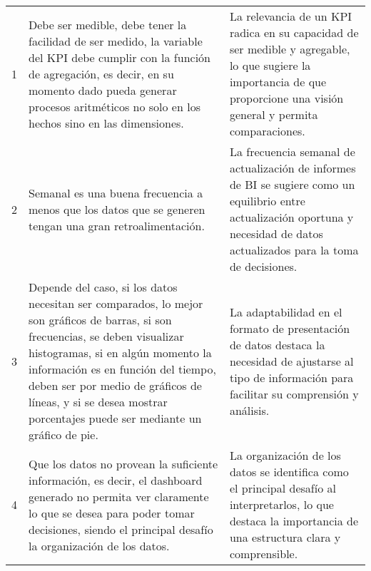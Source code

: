\begin{longtable}{|p{0.6cm}|p{6cm}|p{6cm}|}
    1                                                 & Debe ser medible, debe tener la facilidad de ser medido, la variable del KPI debe cumplir con la función de agregación, es decir, en su momento dado pueda generar procesos aritméticos no solo en los hechos sino en las dimensiones.                                                                                                                                                                & La relevancia de un KPI radica en su capacidad de ser medible y agregable, lo que sugiere la importancia de que proporcione una visión general y permita comparaciones.                                               \\
    2                                                 & Semanal es una buena frecuencia a menos que los datos que se generen tengan una gran retroalimentación.                                                                                                                                                                                                                                                                                               & La frecuencia semanal de actualización de informes de BI se sugiere como un equilibrio entre actualización oportuna y necesidad de datos actualizados para la toma de decisiones.                                     \\
    3                                                 & Depende del caso, si los datos necesitan ser comparados, lo mejor son gráficos de barras, si son frecuencias, se deben visualizar histogramas, si en algún momento la información es en función del tiempo, deben ser por medio de gráficos de líneas, y si se desea mostrar porcentajes puede ser mediante un gráfico de pie.                                                                        & La adaptabilidad en el formato de presentación de datos destaca la necesidad de ajustarse al tipo de información para facilitar su comprensión y análisis.                                                            \\
    4                                                 & Que los datos no provean la suficiente información, es decir, el dashboard generado no permita ver claramente lo que se desea para poder tomar decisiones, siendo el principal desafío la organización de los datos.                                                                                                                                                                                  & La organización de los datos se identifica como el principal desafío al interpretarlos, lo que destaca la importancia de una estructura clara y comprensible.                                                         \\

\end{longtable}
